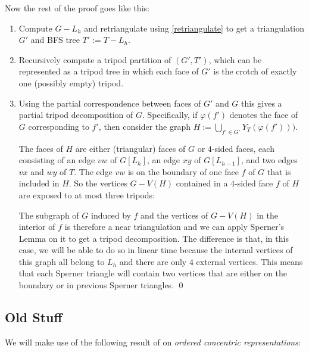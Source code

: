 \documentclass{patmorin}
\begin{document}
Now the rest of the proof goes like this:
\begin{enumerate}
  \item Compute $G-L_h$ and retriangulate using \cref{retriangulate} to get a triangulation $G'$ and BFS tree $T':=T-L_h$.
  \item Recursively compute a tripod partition of $(G',T')$, which can be represented as a tripod tree in which each face of $G'$ is the crotch of exactly one (possibly empty) tripod.
  \item Using the partial correspondence between faces of $G'$ and $G$ this gives a partial tripod decomposition of $G$. Specifically, if $\varphi(f')$ denotes the face of $G$ corresponding to $f'$, then consider the graph  $H:=\bigcup_{f'\in G'} Y_{T}(\varphi(f')))$.

  The faces of $H$ are either (triangular) faces of $G$ or $4$-sided faces, each consisting of an edge $vw$ of $G[L_h]$, an edge $xy$ of $G[L_{h-1}]$, and two edges $vx$ and $wy$ of $T$. The edge $vw$ is on the boundary of one face $f$ of $G$ that is included in $H$. So the vertices $G-V(H)$ contained in a $4$-sided face $f$ of $H$ are exposed to at most three tripods:
  The subgraph of $G$ induced by $f$ and the vertices of $G-V(H)$ in the interior of $f$ is therefore a near triangulation and we can apply Sperner's Lemma on it to get a tripod decomposition.  The difference is that, in this case, we will be able to do so in linear time because the internal vertices of this graph all belong to $L_h$ and there are only $4$ external vertices.  This means that each Sperner triangle will contain two vertices that are either on the boundary or in previous Sperner triangles. \hfill\qed
\end{enumerate}

\subsection{Old Stuff}




We will make use of the following result of \citet{pupyrev:mixed} on \emph{ordered concentric representations}:
\end{document}
